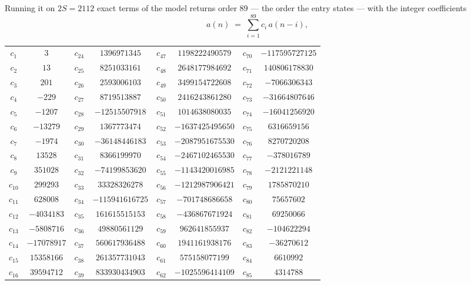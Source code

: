 \documentclass[11pt,a4paper]{article}
\theoremstyle{plain}
\theoremstyle{definition}
\begin{document}
Running it on $2S=2112$ exact terms of the model returns order $89$ --- the order the
entry states --- with the integer coefficients
\[
a(n)\;=\;\sum_{i=1}^{89}c_i\,a(n-i),
\]
\begin{center}\small
\begin{tabular}{cccccccc}
$c_{1}$ & $3$ & $c_{24}$ & $1396971345$ & $c_{47}$ & $1198222490579$ & $c_{70}$ & $-117595727125$ \\
$c_{2}$ & $13$ & $c_{25}$ & $8251033161$ & $c_{48}$ & $2648177984692$ & $c_{71}$ & $140806178830$ \\
$c_{3}$ & $201$ & $c_{26}$ & $2593006103$ & $c_{49}$ & $3499154722608$ & $c_{72}$ & $-7066306343$ \\
$c_{4}$ & $-229$ & $c_{27}$ & $8719513887$ & $c_{50}$ & $2416243861280$ & $c_{73}$ & $-31664807646$ \\
$c_{5}$ & $-1207$ & $c_{28}$ & $-12515507918$ & $c_{51}$ & $1014638080035$ & $c_{74}$ & $-16041256920$ \\
$c_{6}$ & $-13279$ & $c_{29}$ & $1367773474$ & $c_{52}$ & $-1637425495650$ & $c_{75}$ & $6316659156$ \\
$c_{7}$ & $-1974$ & $c_{30}$ & $-36148446183$ & $c_{53}$ & $-2087951675530$ & $c_{76}$ & $8270720208$ \\
$c_{8}$ & $13528$ & $c_{31}$ & $8366199970$ & $c_{54}$ & $-2467102465530$ & $c_{77}$ & $-378016789$ \\
$c_{9}$ & $351028$ & $c_{32}$ & $-74199853620$ & $c_{55}$ & $-1143420016985$ & $c_{78}$ & $-2121221148$ \\
$c_{10}$ & $299293$ & $c_{33}$ & $33328326278$ & $c_{56}$ & $-1212987906421$ & $c_{79}$ & $1785870210$ \\
$c_{11}$ & $628008$ & $c_{34}$ & $-115941616725$ & $c_{57}$ & $-701748686658$ & $c_{80}$ & $75657602$ \\
$c_{12}$ & $-4034183$ & $c_{35}$ & $161615515153$ & $c_{58}$ & $-436867671924$ & $c_{81}$ & $69250066$ \\
$c_{13}$ & $-5808716$ & $c_{36}$ & $49880561129$ & $c_{59}$ & $962641855937$ & $c_{82}$ & $-104622294$ \\
$c_{14}$ & $-17078917$ & $c_{37}$ & $560617936488$ & $c_{60}$ & $1941161938176$ & $c_{83}$ & $-36270612$ \\
$c_{15}$ & $15358166$ & $c_{38}$ & $261357731043$ & $c_{61}$ & $575158077199$ & $c_{84}$ & $6610992$ \\
$c_{16}$ & $39594712$ & $c_{39}$ & $833930434903$ & $c_{62}$ & $-1025596414109$ & $c_{85}$ & $4314788$ \\

\end{tabular}
\end{center}
\end{document}
